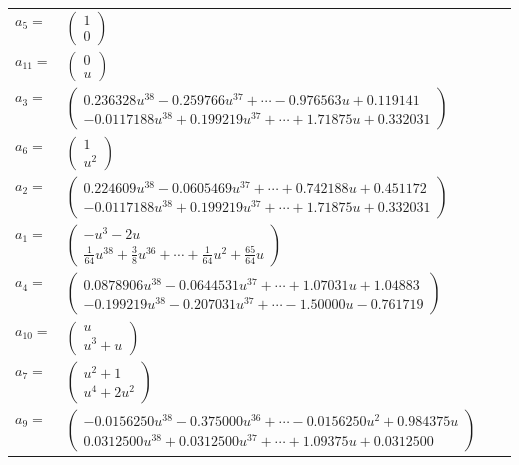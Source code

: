 \documentclass[1p]{elsarticle_modified}
\theoremstyle{definition}
\begin{document}
\begin{tabular}{m{7pt} m{180pt} m{7pt} m{180pt} }
\flushright $a_{5}=$&$\begin{pmatrix}1\\0\end{pmatrix}$ \\
\flushright $a_{11}=$&$\begin{pmatrix}0\\u\end{pmatrix}$ \\
\flushright $a_{3}=$&$\begin{pmatrix}0.236328 u^{38}-0.259766 u^{37}+\cdots-0.976563 u+0.119141\\-0.0117188 u^{38}+0.199219 u^{37}+\cdots+1.71875 u+0.332031\end{pmatrix}$ \\
\flushright $a_{6}=$&$\begin{pmatrix}1\\u^2\end{pmatrix}$ \\
\flushright $a_{2}=$&$\begin{pmatrix}0.224609 u^{38}-0.0605469 u^{37}+\cdots+0.742188 u+0.451172\\-0.0117188 u^{38}+0.199219 u^{37}+\cdots+1.71875 u+0.332031\end{pmatrix}$ \\
\flushright $a_{1}=$&$\begin{pmatrix}- u^3-2 u\\\frac{1}{64} u^{38}+\frac{3}{8} u^{36}+\cdots+\frac{1}{64} u^2+\frac{65}{64} u\end{pmatrix}$ \\
\flushright $a_{4}=$&$\begin{pmatrix}0.0878906 u^{38}-0.0644531 u^{37}+\cdots+1.07031 u+1.04883\\-0.199219 u^{38}-0.207031 u^{37}+\cdots-1.50000 u-0.761719\end{pmatrix}$ \\
\flushright $a_{10}=$&$\begin{pmatrix}u\\u^3+u\end{pmatrix}$ \\
\flushright $a_{7}=$&$\begin{pmatrix}u^2+1\\u^4+2 u^2\end{pmatrix}$ \\
\flushright $a_{9}=$&$\begin{pmatrix}-0.0156250 u^{38}-0.375000 u^{36}+\cdots-0.0156250 u^{2}+0.984375 u\\0.0312500 u^{38}+0.0312500 u^{37}+\cdots+1.09375 u+0.0312500\end{pmatrix}$ \\

\end{tabular}
\end{document}
